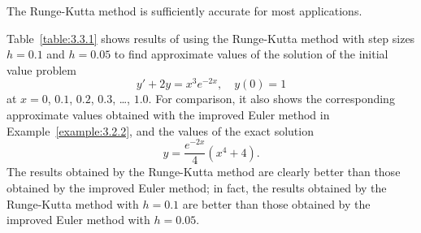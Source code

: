 The Runge-Kutta method is sufficiently accurate for most applications.

\begin{example}
  \label{example:3.3.2} \rm Table~\ref{table:3.3.1} shows results of using the Runge-Kutta method
  with step sizes $h=0.1$ and $h=0.05$ to find approximate values of the solution of the initial
  value problem
  \[
    y'+2y=x^{3}e^{-2x},\quad y(0)=1
  \]
  at $x=0$, $0.1$, $0.2$, $0.3$, \dots, $1.0$. For comparison, it also shows the corresponding
  approximate values obtained with the improved Euler method in Example~\ref{example:3.2.2}, and the
  values of the exact solution
  \[
    y=\frac{e^{-2x}}{4}(x^{4}+4).
  \]
  The results obtained by the Runge-Kutta method are clearly better than those obtained by the
  improved Euler method; in fact, the results obtained by the Runge-Kutta method with $h=0.1$ are
  better than those obtained by the improved Euler method with $h=0.05$.
\end{example}

